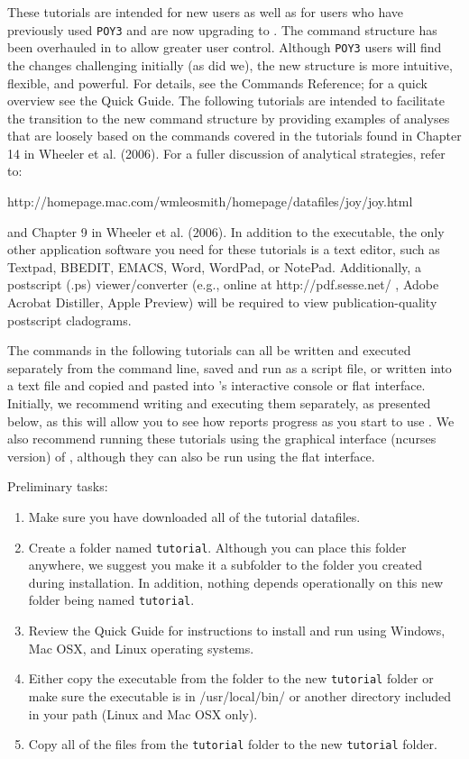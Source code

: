 These tutorials are intended for new \poy users as well as for users who 
have previously used \texttt{POY3} and are now upgrading to \poy. The command structure 
has been overhauled in \poy to allow greater user control. Although \texttt{POY3} users 
will find the changes challenging initially (as did we), the new structure is 
more intuitive, flexible, and powerful. For details, see the \poy Commands 
Reference; for a quick overview see the \poy Quick Guide. The following 
tutorials are intended to facilitate the transition to the new command structure 
by providing examples of analyses that are loosely based on the commands covered 
in the tutorials found in Chapter 14 in Wheeler et al. (2006). For a fuller 
discussion of analytical strategies, refer to:\
\begin{center}
http://homepage.mac.com/wmleosmith/homepage/datafiles/joy/joy.html
\end{center}
and Chapter 9 
in Wheeler et al. (2006). In addition to the \poy executable, the only other 
application software you need for these tutorials is a text editor, such as 
Textpad, BBEDIT, EMACS, Word, WordPad, or NotePad. Additionally, a postscript 
(.ps) viewer/converter (e.g., online at http://pdf.sesse.net/ , Adobe Acrobat 
Distiller, Apple Preview) will be required to view publication-quality 
postscript cladograms.

The commands in the following tutorials can all be written and executed 
separately from the command line, saved and run as a script file, or written 
into a text file and copied and pasted into \poy's interactive console or flat 
interface. Initially, we recommend writing and executing them separately, as 
presented below, as this will allow you to see how \poy reports progress as you 
start to use \poy. We also recommend running these tutorials using the graphical 
interface (ncurses version) of \poy, although they can also be run using the 
flat interface.

Preliminary tasks:
\begin{enumerate}
    \item Make sure you have downloaded all of the \poy tutorial datafiles. 
    \item Create a folder named \texttt{tutorial}. Although you can place this folder anywhere, we suggest you make it a 
        subfolder to the \poy folder you created during installation. In addition, nothing depends operationally on this new folder being 
        named \texttt{tutorial}. 
    \item Review the \poy Quick Guide for instructions to install and run \poy using 
        Windows, Mac OSX, and Linux operating systems. 
    \item Either copy the \poy executable from the \poy folder to the new
        \texttt{tutorial}
        folder or make sure the executable is in /usr/local/bin/ or another directory 
        included in your path (Linux and Mac OSX only). 
    \item Copy all of the files from the \poy \texttt{tutorial} folder to the new
        \texttt{tutorial} 
        folder. 
\end{enumerate}

